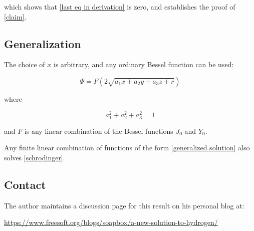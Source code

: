 \documentclass{article}
\begin{document}
which shows that \eqref{last eq in derivation} is zero, and establishes the proof of \eqref{claim}.

\subsection*{Generalization}

The choice of $x$ is arbitrary, and any ordinary Bessel function can be used:

\begin{equation}
\label{generalized solution}
\Psi = F(2\sqrt{a_1 x+ a_2 y+ a_3 z+r})
\end{equation}

where

\begin{equation*}
a_1^2+a_2^2+a_3^2=1
\end{equation*}

and $F$ is any linear combination of the Bessel functions $J_0$ and $Y_0$.

\vskip 12pt

Any finite linear combination of functions of the form \eqref{generalized solution} also solves \eqref{schrodinger}.

\subsection*{Contact}

The author maintains a discussion page for this result on his personal blog at:

\begin{center}
\small
\url{https://www.freesoft.org/blogs/soapbox/a-new-solution-to-hydrogen/}
\end{center}
\end{document}
